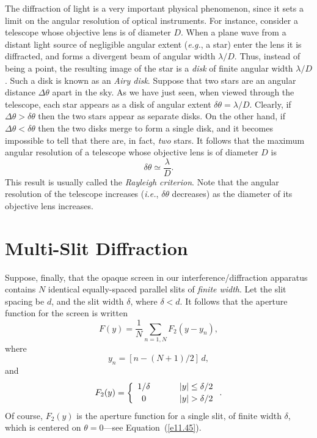 The diffraction of light is a very important physical phenomenon, since it sets a limit on the angular resolution of optical instruments. For instance, consider a
telescope whose objective lens is of diameter $D$. When a plane wave from a distant light  source  of negligible angular
extent ({\em e.g.}, a star) enter the lens it is  diffracted, and forms a divergent beam of angular width $\lambda/D$. 
Thus, instead of  being a point, the resulting image of the star is  a {\em disk}\/ of finite angular width $\lambda/D$. Such a disk is known
as an {\em Airy disk}. Suppose that two stars are an angular distance $\Delta\theta$ apart in the sky. As we have just seen, when viewed through
the telescope, each star appears as a disk of angular extent $\delta\theta=\lambda/D$. Clearly, if $\Delta\theta>\delta\theta$ then
the two stars  appear as separate disks. On the other hand, if $\Delta\theta < \delta\theta$ then the two
disks merge to form a single disk, and it becomes impossible to tell that there are, in fact, {\em two}\/ stars. 
It follows that the
maximum angular resolution of a telescope whose objective lens is of diameter $D$ is
\begin{equation}
\delta\theta \simeq \frac{\lambda}{D}.
\end{equation}
This result is usually called the {\em Rayleigh criterion}. 
Note that the angular resolution of the telescope increases  ({\em i.e.}, $\delta\theta$ decreases) as the diameter of its objective lens increases. 

\section{Multi-Slit Diffraction}
Suppose, finally,  that the opaque screen in our interference/diffraction apparatus contains $N$ identical equally-spaced parallel slits of {\em finite width}. Let the slit spacing be $d$, and the
slit width $\delta$, where $\delta < d$. It follows that the aperture function for the screen is written
\begin{equation}
F(y) = \frac{1}{N}\sum_{n=1,N} F_2(y-y_n),
\end{equation}
where
\begin{equation}
y_n = [n-(N+1)/2]\,d,
\end{equation}
and
\begin{equation}
F_2(y)=\left\{
\begin{array}{ccc}
1/\delta&\mbox{\hspace{0.5cm}}&|y|\leq \delta/2\\[0.5ex]
0 &&|y|> \delta/2
\end{array}\right..
\end{equation}
Of course, $F_2(y)$ is the aperture function for a single slit,  of finite width $\delta$, which is centered on $\theta=0$---see Equation~(\ref{e11.45}).

